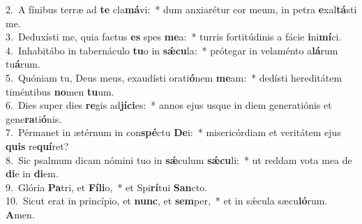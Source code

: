{2.~}A fínibus terræ ad \textbf{te} cla\textbf{má}vi:~* dum anxiarétur cor meum, in petra \textbf{e}xal\textbf{tá}sti me.\\
{3.~}Deduxísti me, quia factus \textbf{es} spes \textbf{me}a:~* turris fortitúdinis a fácie \textbf{i}ni\textbf{mí}ci.\\
{4.~}Inhabitábo in tabernáculo \textbf{tu}o in \textbf{sǽ}\textbf{cu}la:~* prótegar in velaménto a\textbf{lá}rum tu\textbf{á}rum.\\
{5.~}Quóniam tu, Deus meus, exaudísti orati\textbf{ó}nem \textbf{me}am:~* dedísti hereditátem timéntibus \textbf{no}men \textbf{tu}um.\\
{6.~}Dies super dies \textbf{re}gis ad\textbf{jí}\textbf{ci}es:~* annos ejus usque in diem generatiónis et gene\textbf{ra}ti\textbf{ó}nis.\\
{7.~}Pérmanet in ætérnum in con\textbf{spé}ctu \textbf{De}i:~* misericórdiam et veritátem ejus \textbf{quis} re\textbf{quí}ret?\\
{8.~}Sic psalmum dicam nómini tuo in \textbf{sǽ}culum \textbf{sǽ}\textbf{cu}li:~* ut reddam vota mea de \textbf{di}e in \textbf{di}em.\\
{9.~}Glória \textbf{Pa}tri, et \textbf{Fí}\textbf{li}o,~* et Spi\textbf{rí}tui \textbf{San}cto.\\
{10.~}Sicut erat in princípio, et \textbf{nunc}, et \textbf{sem}per,~* et in sǽcula sæcu\textbf{ló}rum. \textbf{A}men.\\
